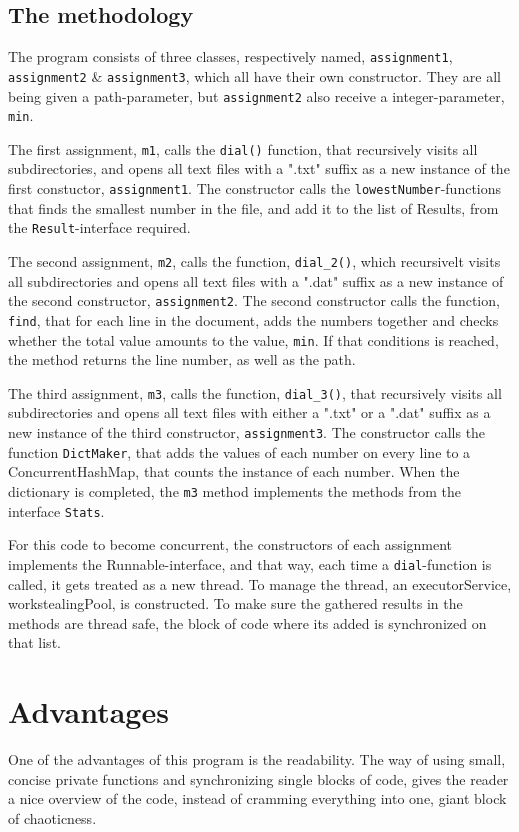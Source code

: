 \documentclass[11pt]{article}
\begin{document}
\subsection{The methodology}
The program consists of three classes, respectively named, \texttt{assignment1}, \texttt{assignment2} \& \texttt{assignment3}, which all have their own constructor. They are all being given a path-parameter, but \texttt{assignment2} also receive a integer-parameter, \texttt{min}. 

The first assignment, \texttt{m1}, calls the \texttt{dial()} function, that recursively visits all subdirectories, and opens all text files with a ".txt" suffix as a new instance of the first constuctor, \texttt{assignment1}. The constructor calls the \texttt{lowestNumber}-functions that finds the smallest number in the file, and add it to the list of Results, from the \texttt{Result}-interface required.

The second assignment, \texttt{m2}, calls the function, \texttt{dial\_2()}, which recursivelt visits all subdirectories and opens all text files with a ".dat" suffix as a new instance of the second constructor, \texttt{assignment2}. The second constructor calls the function, \texttt{find}, that for each line in the document, adds the numbers together and checks whether the total value amounts to the value, \texttt{min}. If that conditions is reached, the method returns the line number, as well as the path. 

The third assignment, \texttt{m3}, calls the function, \texttt{dial\_3()}, that recursively visits all subdirectories and opens all text files with either a ".txt" or a ".dat" suffix as a new instance of the third constructor, \texttt{assignment3}. The constructor calls the function \texttt{DictMaker}, that adds the values of each number on every line to a ConcurrentHashMap, that counts the instance of each number. When the dictionary is completed, the \texttt{m3} method implements the methods from the interface \texttt{Stats}.

For this code to become concurrent, the constructors of each assignment implements the Runnable-interface, and that way, each time a \texttt{dial}-function is called, it gets treated as a new thread. To manage the thread, an executorService, workstealingPool, is constructed. To make sure the gathered results in the methods are thread safe, the block of code where its added is synchronized on that list.

\section{Advantages}
One of the advantages of this program is the readability. The way of using small, concise private functions and synchronizing single blocks of code, gives the reader a nice overview of the code, instead of cramming everything into one, giant block of chaoticness.  
\end{document}
